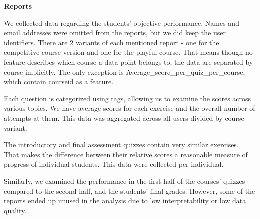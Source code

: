 \textbf{Reports}

We collected data regarding the students' objective performance. Names and email addresses were omitted from the reports, but we did keep the user identifiers. There are 2 variants of each mentioned report - one for the competitive course version and one for the playful course. That means though no feature describes which course a data point belongs to, the data are separated by course implicitly. The only exception is Average\_score\_per\_quiz\_per\_course, which contain courseid as a feature.

Each question is categorized using tags, allowing us to examine the scores across various topics. We have average scores for each exercise and the overall number of attempts at them. This data was aggregated across all users divided by course variant.

The introductory and final assessment quizzes contain very similar exercises. That makes the difference between their relative scores a reasonable measure of progress of individual students. This data were collected per individual.

Similarly, we examined the performance in the first half of the courses' quizzes compared to the second half, and the students' final grades. However, some of the reports ended up unused in the analysis due to low interpretability or low data quality.

